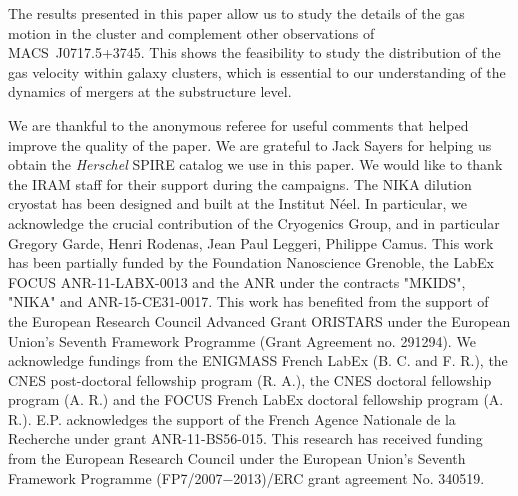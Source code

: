 \documentclass[twocolumn,traditabstract]{aa}
\begin{document}
The results presented in this paper allow us to study the details of the gas motion in the cluster and complement other observations of \mbox{MACS~J0717.5+3745}. This shows the feasibility to study the distribution of the gas velocity within galaxy clusters, which is essential to our understanding of the dynamics of mergers at the substructure level.

\begin{acknowledgements}
We are thankful to the anonymous referee for useful comments that helped improve the quality of the paper.
We are grateful to Jack Sayers for helping us obtain the \textit{Herschel} SPIRE catalog we use in this paper.
We would like to thank the IRAM staff for their support during the campaigns. 
The NIKA dilution cryostat has been designed and built at the Institut N\'eel. In particular, we acknowledge the crucial contribution of the Cryogenics Group, and in particular Gregory Garde, Henri Rodenas, Jean Paul Leggeri, Philippe Camus. 
This work has been partially funded by the Foundation Nanoscience Grenoble, the LabEx FOCUS ANR-11-LABX-0013 and the ANR under the contracts "MKIDS", "NIKA" and ANR-15-CE31-0017. 
This work has benefited from the support of the European Research Council Advanced Grant ORISTARS under the European Union's Seventh Framework Programme (Grant Agreement no. 291294).
We acknowledge fundings from the ENIGMASS French LabEx (B. C. and F. R.), the CNES post-doctoral fellowship program (R. A.), the CNES doctoral fellowship program (A. R.) and the FOCUS French LabEx doctoral fellowship program (A. R.).
E.P. acknowledges the support of the French Agence Nationale de la Recherche under grant ANR-11-BS56-015.
This research has received funding from the European Research Council under the European Union’s Seventh Framework Programme (FP7/2007−2013)/ERC grant agreement No. 340519.
\end{acknowledgements}


\end{document}
